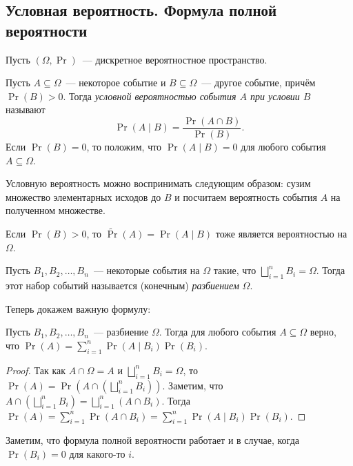 \subsection{Условная вероятность. Формула полной вероятности}
Пусть \((\Omega, \Pr)\)~--- дискретное вероятностное пространство.
\begin{definition}
    Пусть \(A \subseteq \Omega\)~--- некоторое событие и \(B \subseteq \Omega\)~--- другое событие, причём \(\Pr(B) > 0\). Тогда \emph{условной вероятностью события \(A\) при условии \(B\)} называют \[\Pr(A \mid B) = \dfrac{\Pr(A \cap B)}{\Pr(B)}.\]
    Если \(\Pr(B) = 0\), то положим, что \(\Pr(A \mid B) = 0\) для любого события \(A \subseteq \Omega\).
\end{definition}
Условную вероятность можно воспринимать следующим образом: сузим множество элементарных исходов до \(B\) и посчитаем вероятность события \(A\) на полученном множестве.
\begin{remark}
    Если \(\Pr(B) > 0\), то \(\tilde{\Pr}(A) = \Pr(A \mid B)\) тоже является вероятностью на \(\Omega\).
\end{remark}
\begin{definition}
    Пусть \(B_1, B_2, \ldots, B_n\)~--- некоторые события на \(\Omega\) такие, что \(\bigsqcup\limits_{i = 1}^{n} B_i = \Omega\). Тогда этот набор событий называется (конечным) \emph{разбиением} \(\Omega\).
\end{definition}
Теперь докажем важную формулу:
\begin{law-of-total-probability}
    Пусть \(B_1, B_2, \ldots, B_n\)~--- разбиение \(\Omega\). Тогда для любого события \(A \subseteq \Omega\) верно, что \(\Pr(A) = \sum\limits_{i = 1}^{n} \Pr(A \mid B_i)\Pr(B_i).\)
\end{law-of-total-probability}
\begin{proof}
    Так как \(A \cap \Omega = A\) и \(\bigsqcup\limits_{i = 1}^{n} B_i = \Omega\), то \(\Pr(A) = \Pr\left(A \cap \left(\bigsqcup\limits_{i = 1}^{n} B_i\right)\right)\). Заметим, что \(A \cap \left(\bigsqcup\limits_{i = 1}^{n} B_i\right) = \bigsqcup\limits_{i = 1}^{n} (A \cap B_i)\). Тогда
    \(\Pr(A) = \sum\limits_{i = 1}^{n} \Pr(A \cap B_i) = \sum\limits_{i = 1}^{n} \Pr(A \mid B_i)\Pr(B_i)\).
\end{proof}
Заметим, что формула полной вероятности работает и в случае, когда \(\Pr(B_i) = 0\) для какого-то \(i\).
